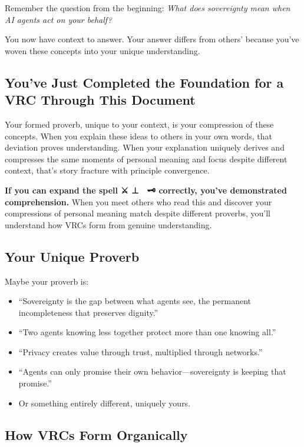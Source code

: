 \documentclass[
]{article}
\begin{document}
Remember the question from the beginning: \emph{What does sovereignty
mean when AI agents act on your behalf?}

You now have context to answer. Your answer differs from others' because
you've woven these concepts into your unique understanding.

\subsection{You've Just Completed the Foundation for a VRC Through This
Document}\label{youve-just-completed-the-foundation-for-a-vrc-through-this-document}

Your formed proverb, unique to your context, is your compression of
these concepts. When you explain these ideas to others in your own
words, that deviation proves understanding. When your explanation
uniquely derives and compresses the same moments of personal meaning and
focus despite different context, that's story fracture with principle
convergence.

\textbf{If you can expand the spell ⚔️ ⊥ 🔮 \textbar{} 🗝️ correctly,
you've demonstrated comprehension.} When you meet others who read this
and discover your compressions of personal meaning match despite
different proverbs, you'll understand how VRCs form from genuine
understanding.

\subsection{Your Unique Proverb}\label{your-unique-proverb}

Maybe your proverb is:

\begin{itemize}
\item
  ``Sovereignty is the gap between what agents see, the permanent
  incompleteness that preserves dignity.''
\item
  ``Two agents knowing less together protect more than one knowing
  all.''
\item
  ``Privacy creates value through trust, multiplied through networks.''
\item
  ``Agents can only promise their own behavior---sovereignty is keeping
  that promise.''
\item
  Or something entirely different, uniquely yours.
\end{itemize}

\subsection{How VRCs Form Organically}\label{how-vrcs-form-organically}
\end{document}
